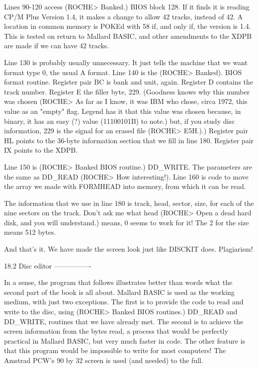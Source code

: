Lines 90-120 access (ROCHE> Banked.) BIOS block 128. If it finds it is reading 
CP/M Plus Version 1.4, it makes a change to allow 42 tracks, instead of 42.  A 
location  in  common memory is POKEd with 58 if, and only if, the  version  is 
1.4.  This is tested on return to Mallard BASIC, and other amendments  to  the 
XDPB are made if we can have 42 tracks.

Line  130 is probably usually unnecessary. It just tells the machine  that  we 
want format type 0, the usual A format. Line 140 is the (ROCHE> Banked).  BIOS 
format routine. Register pair BC is bank and unit, again. Register D  contains 
the  track number. Register E the filler byte, 229. (Goodness knows  why  this 
number was chosen (ROCHE> As far as I know, it was IBM who chose, circa  1972, 
this  value  as  an "empty" flag. Legend has it that  this  value  was  chosen 
because, in binary, it has an easy (?) value (11100101B) to note.) but, if you 
study  disc information, 229 is the signal for an erased file (ROCHE>  E5H.).) 
Register  pair  HL points to the 36-byte information section that we  fill  in 
line 180. Register pair IX points to the XDPB.

Line  150  is (ROCHE> Banked BIOS routine.) DD_WRITE. The parameters  are  the 
same as DD_READ (ROCHE> How interesting!). Line 160 is code to move the  array 
we made with FORMHEAD into memory, from which it can be read.

The information that we use in line 180 is track, head, sector, size, for each 
of  the nine sectors on the track. Don't ask me what head (ROCHE> Open a  dead 
hard disk, and you will understand.) means, 0 seems to work for it! The 2  for 
the size means 512 bytes.

And  that's  it.  We  have  made the  screen  look  just  like  DISCKIT  does. 
Plagiarism!


18.2 Disc editor
----------------

In  a sense, the program that follows illustrates better than words  what  the 
second  part  of the book is all about. Mallard BASIC is used as  the  working 
medium, with just two exceptions. The first is to provide the code to read and 
write to the disc, using (ROCHE> Banked BIOS routines.) DD_READ and  DD_WRITE, 
routines  that  we  have  already met. The second is  to  achieve  the  screen 
information  from the bytes read, a process that would be perfectly  practical 
in Mallard BASIC, but very much faster in code. The other feature is that this 
program would be impossible to write for most computers! The Amstrad PCW's  90 
by 32 screen is used (and needed) to the full.

